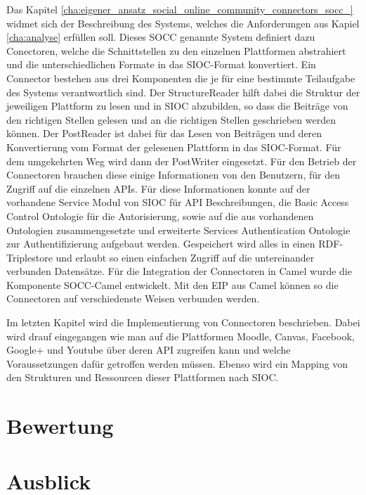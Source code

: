 Das Kapitel \ref{cha:eigener_ansatz_social_online_community_connectors_socc_} widmet sich der Beschreibung des Systems, welches die Anforderungen aus Kapiel \ref{cha:analyse} erfüllen soll. Dieses SOCC genannte System definiert dazu Conectoren, welche die Schnittstellen zu den einzelnen Plattformen abstrahiert und die unterschiedlichen Formate in das SIOC-Format konvertiert. Ein Connector bestehen aus drei Komponenten die je für eine bestimmte Teilaufgabe des Systems verantwortlich sind. Der StructureReader hilft dabei die Struktur der jeweiligen Plattform zu lesen und  in SIOC abzubilden, so dass die Beiträge von den richtigen Stellen gelesen und an die richtigen Stellen geschrieben werden können. Der PostReader ist dabei für das Lesen von Beiträgen und deren Konvertierung vom Format der gelesenen Plattform in das SIOC-Format. Für dem umgekehrten Weg wird dann der PostWriter eingesetzt. Für den Betrieb der Connectoren brauchen diese einige Informationen von den Benutzern, für den Zugriff auf die einzelnen APIs. Für diese Informationen konnte auf der vorhandene Service Modul von SIOC für API Beschreibungen, die Basic Access Control Ontologie für die Autorisierung, sowie auf die aus vorhandenen Ontologien zusammengesetzte und erweiterte Services Authentication Ontologie zur Authentifizierung aufgebaut werden. Gespeichert wird alles in einen RDF-Triplestore und erlaubt so einen einfachen Zugriff auf die untereinander verbunden Datensätze. Für die Integration der Connectoren in Camel wurde die Komponente SOCC-Camel entwickelt. Mit den EIP aus Camel können so die Connectoren auf verschiedenste Weisen verbunden werden.

Im letzten Kapitel wird die Implementierung von Connectoren beschrieben. Dabei wird drauf eingegangen wie man auf die Plattformen Moodle, Canvas, Facebook, Google+ und Youtube über deren API zugreifen kann und welche Voraussetzungen dafür getroffen werden müssen. Ebenso wird ein Mapping von den Strukturen und Ressourcen dieser Plattformen nach SIOC. 




\section{Bewertung} %
\label{sec:bewertung}


\section{Ausblick} %
\label{sec:ausblick}




